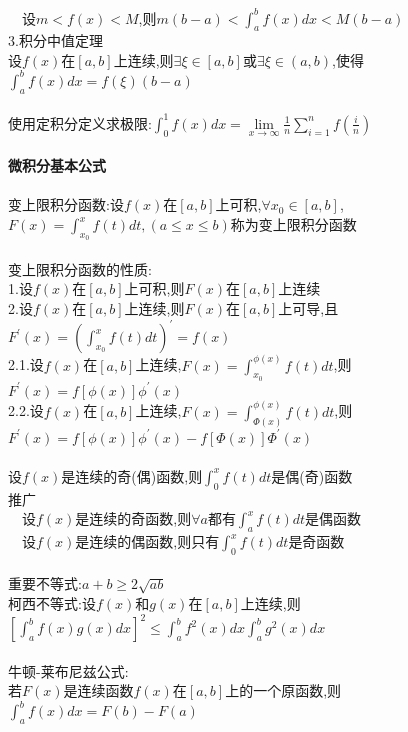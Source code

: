 \documentclass{article}
\begin{document}
\begin{flushleft}
	\ \ 设$m<f(x)<M$,则$m(b-a)<\int_{a}^{b}f(x)dx<M(b-a)$\\
	3.积分中值定理\\
	设$f(x)$在$[a,b]$上连续,则$\exists \xi \in [a,b]$或$\exists \xi \in (a,b)$,使得$\int_{a}^{b}f(x)dx=f(\xi)(b-a)$\\
	~\\
	使用定积分定义求极限:$\int_{0}^{1}f(x)dx=\lim\limits_{x\to \infty}\frac{1}{n}\sum_{i=1}^{n}f(\frac{i}{n})$\\
	~\\ \textbf{微积分基本公式} \\~\\
	变上限积分函数:设$f(x)$在$[a,b]$上可积,$\forall x_0\in [a,b]$,$F(x)=\int_{x_0}^{x}f(t)dt,(a\le x\le b)$称为变上限积分函数\\
	~\\
	变上限积分函数的性质:\\
	1.设$f(x)$在$[a,b]$上可积,则$F(x)$在$[a,b]$上连续\\
	2.设$f(x)$在$[a,b]$上连续,则$F(x)$在$[a,b]$上可导,且$F^{'}(x)=(\int_{x_0}^{x}f(t)dt)^{'}=f(x)$\\
	2.1.设$f(x)$在$[a,b]$上连续,$F(x)=\int_{x_0}^{\phi(x)}f(t)dt$,则$F^{'}(x)=f[\phi(x)]\phi^{'}(x)$\\
	2.2.设$f(x)$在$[a,b]$上连续,$F(x)=\int_{\Phi(x)}^{\phi(x)}f(t)dt$,则$F^{'}(x)=f[\phi(x)]\phi^{'}(x)-f[\Phi(x)]\Phi^{'}(x)$\\
	~\\
	设$f(x)$是连续的奇(偶)函数,则$\int_{0}^{x}f(t)dt$是偶(奇)函数\\
	推广\\
	\ \ 设$f(x)$是连续的奇函数,则$\forall a$都有$\int_{a}^{x}f(t)dt$是偶函数\\
	\ \ 设$f(x)$是连续的偶函数,则只有$\int_{0}^{x}f(t)dt$是奇函数\\
	~\\
	重要不等式:$a+b\ge 2\sqrt{ab}$\\
	柯西不等式:设$f(x)$和$g(x)$在$[a,b]$上连续,则$[\int_{a}^{b}f(x)g(x)dx]^2\le \int_{a}^{b}f^2(x)dx\int_{a}^{b}g^2(x)dx$\\
	~\\
	牛顿-莱布尼兹公式:\\
	若$F(x)$是连续函数$f(x)$在$[a,b]$上的一个原函数,则$\int_{a}^{b}f(x)dx=F(b)-F(a)$\\
	
\end{flushleft}
\end{document}
